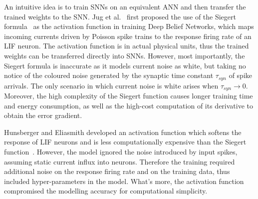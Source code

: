 \documentclass{article}
\begin{document}
An intuitive idea is to train SNNs on an equivalent ANN and then transfer the trained weights to the SNN.
Jug et al.~\cite{Jug_etal_2012} first proposed the use of the Siegert formula~\cite{siegert1951first} as the activation function in training Deep Belief Networks, which maps incoming currents driven by Poisson spike trains \texttt{}to the response firing rate of an LIF neuron.
The activation function is in actual physical units, thus the trained weights can be transferred directly into SNNs.
However, most importantly, the Siegert formula is inaccurate as it models current noise as white, but taking no notice of the coloured noise generated by the synaptic time constant $\tau_{syn}$ of spike arrivals. The only scenario in which current noise is  white arises when $\tau_{syn} \to 0$.
Moreover, the high complexity of the Siegert function causes longer training time and  energy consumption, as well as the high-cost computation of its derivative to obtain the error gradient.

Hunsberger and Eliasmith developed an activation function which softens the response of LIF neurons and is less computationally expensive than the Siegert function~\cite{hunsberger2015spiking}.
However, the model ignored the noise introduced by input spikes, assuming static current influx into neurons.
Therefore the training required additional noise on the response firing rate and on the training data, thus included hyper-parameters in the model.
What's more, the activation function compromised the modelling accuracy for computational simplicity.
\end{document}
